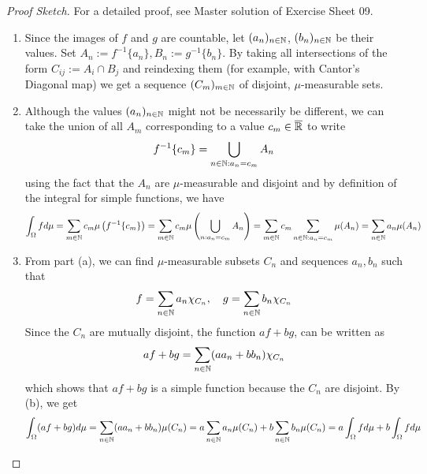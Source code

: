\begin{proof}[Proof Sketch]
  For a detailed proof, see Master solution of Exercise Sheet 09.
  \begin{enumerate}
    \item Since the images of $f$ and $g$ are countable, let $(a_n)_{n \in \mathbb{N}}$, $(b_n)_{n \in  \mathbb{N}}$ be their values.
      Set $A_n := f^{-1}\{a_n\}, B_n := g^{-1}\{b_n\}$. 
      By taking all intersections of the form $C_{ij} := A_i \cap B_j$ and reindexing them (for example, with Cantor's Diagonal map) we get a sequence  $(C_m)_{m \in \mathbb{N}}$ of disjoint, $\mu$-measurable sets.
    \item Although the values $(a_n)_{n \in \mathbb{N}}$ might not be necessarily be different, we can take the union of all $A_m$ corresponding to a value $c_m \in \overline{\mathbb{R}}$ to write
      \begin{align*}
        f^{-1}\{c_m\} = \bigcup_{n \in \mathbb{N}: a_n = c_m} A_n
      \end{align*}
      using the fact that the $A_n$ are $\mu$-measurable and disjoint 
      and by definition of the integral for simple functions, we have
      \begin{align*}
        \int_{\Omega} f d \mu
        =
        \sum_{m \in \mathbb{N}} c_m \mu\left(
          f^{-1}\{c_m\}
        \right)
        =
        \sum_{m \in \mathbb{N}} c_m \mu\left(
          \bigcup_{n: a_n = c_m}A_n
        \right)
        =
        \sum_{m \in \mathbb{N}} c_m \sum_{n\in \mathbb{N}: a_n = c_m} \mu(A_n) 
        = 
        \sum_{n \in \mathbb{N}} a_n \mu(A_n)
      \end{align*}
    \item From part (a), we can find $\mu$-measurable subsets $C_n$ and sequences $a_n,b_n$ such that
      \begin{align*}
        f = \sum_{n \in \mathbb{N}}a_n \chi_{C_n}, \quad g = \sum_{n \in \mathbb{N}} b_n \chi_{C_n}
      \end{align*}
      Since the $C_n$ are mutually disjoint,
      the function $af + bg$, can be written as
      \begin{align*}
        af + bg = \sum_{n \in \mathbb{N}} (aa_n + bb_n)\chi_{C_n}
      \end{align*}
      which shows that $a f + bg$ is a simple function because the $C_n$ are disjoint.
      By (b), we get
      \begin{align*}
        \int_{\Omega} (af + bg) d \mu = \sum_{n \in \N} (aa_n + bb_n) \mu(C_n) = a\sum_{n \in \N}a_n \mu(C_n) + b\sum_{n \in \N} b_n \mu(C_n) = a\int_{\Omega} f d \mu + b\int_{\Omega} f d \mu

\end{align*}
\end{enumerate}
\end{proof}

